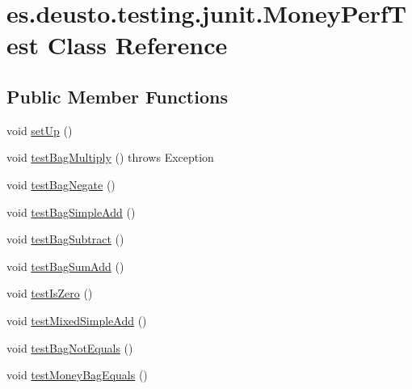 \hypertarget{classes_1_1deusto_1_1testing_1_1junit_1_1_money_perf_test}{}\section{es.\+deusto.\+testing.\+junit.\+Money\+Perf\+Test Class Reference}
\label{classes_1_1deusto_1_1testing_1_1junit_1_1_money_perf_test}
\subsection*{Public Member Functions}
\begin{DoxyCompactItemize}
\item 
void \mbox{\hyperlink{classes_1_1deusto_1_1testing_1_1junit_1_1_money_perf_test_aa24e252a73c82c35d9b623ea276fe29e}{set\+Up}} ()
\item 
void \mbox{\hyperlink{classes_1_1deusto_1_1testing_1_1junit_1_1_money_perf_test_ac5217e7f852f78dde2575d39a7186110}{test\+Bag\+Multiply}} ()  throws Exception 
\item 
void \mbox{\hyperlink{classes_1_1deusto_1_1testing_1_1junit_1_1_money_perf_test_a9bc7f110124f622b0717e8e12f697088}{test\+Bag\+Negate}} ()
\item 
void \mbox{\hyperlink{classes_1_1deusto_1_1testing_1_1junit_1_1_money_perf_test_ac1673cbee6540cd6301ae37572554f6f}{test\+Bag\+Simple\+Add}} ()
\item 
void \mbox{\hyperlink{classes_1_1deusto_1_1testing_1_1junit_1_1_money_perf_test_a5d300aa5f3bb92fa558b5c8afb2f62f0}{test\+Bag\+Subtract}} ()
\item 
void \mbox{\hyperlink{classes_1_1deusto_1_1testing_1_1junit_1_1_money_perf_test_aac894056ed4f7770c451c33e4df3b8b5}{test\+Bag\+Sum\+Add}} ()
\item 
void \mbox{\hyperlink{classes_1_1deusto_1_1testing_1_1junit_1_1_money_perf_test_a6c1d6dd0a4a73db679e23546f618663a}{test\+Is\+Zero}} ()
\item 
void \mbox{\hyperlink{classes_1_1deusto_1_1testing_1_1junit_1_1_money_perf_test_ad57b55fc425d913761a19369319d0bb5}{test\+Mixed\+Simple\+Add}} ()
\item 
void \mbox{\hyperlink{classes_1_1deusto_1_1testing_1_1junit_1_1_money_perf_test_af21168848ab6b50a1aaadf7817ae4ba1}{test\+Bag\+Not\+Equals}} ()
\item 
void \mbox{\hyperlink{classes_1_1deusto_1_1testing_1_1junit_1_1_money_perf_test_a48c18b9ee30df796adbfa9eb09acb9c6}{test\+Money\+Bag\+Equals}} ()

\end{DoxyCompactItemize}
